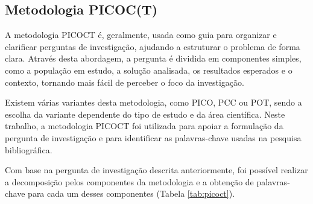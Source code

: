 	
	\subsection{Metodologia PICOC(T)}
	
		A metodologia \gls{PICOCT} é, geralmente, usada como guia para organizar e clarificar perguntas de investigação, ajudando a estruturar o problema de forma clara. Através desta abordagem, a pergunta é dividida em componentes simples, como a população em estudo, a solução analisada, os resultados esperados e o contexto, tornando mais fácil de perceber o foco da investigação.
		
		Existem várias variantes desta metodologia, como PICO, PCC ou POT, sendo a escolha da variante dependente do tipo de estudo e da área científica. Neste trabalho, a metodologia \gls{PICOCT} foi utilizada para apoiar a formulação da pergunta de investigação e para identificar as palavras-chave usadas na pesquisa bibliográfica.
	
		Com base na pergunta de investigação descrita anteriormente, foi possível realizar a decomposição pelos componentes da metodologia e a obtenção de palavras-chave para cada um desses componentes (Tabela \ref{tab:picoct}).
	
